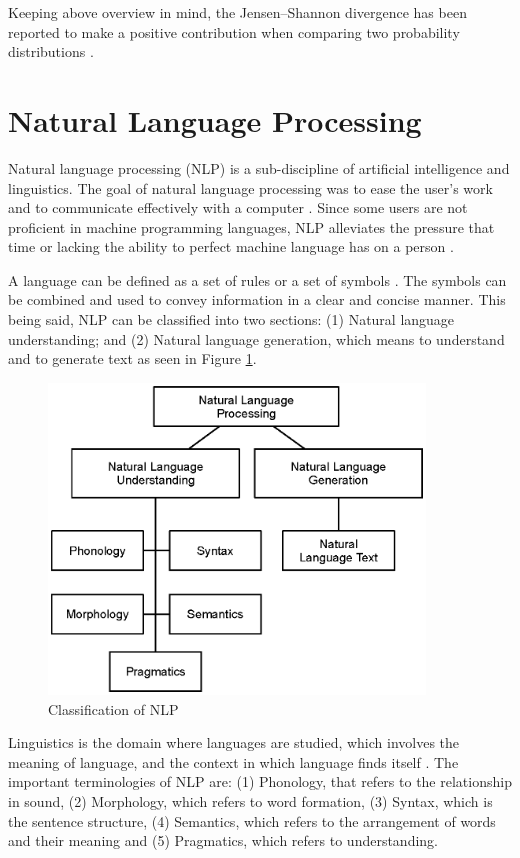 Keeping above overview in mind, the Jensen–Shannon divergence has been reported to make a positive contribution when comparing two probability distributions \cite{Uto2017,9358561}.

\section{Natural Language Processing} \label{secc:LDAover}

Natural language processing (NLP) is a sub-discipline of artificial intelligence and linguistics. The goal of natural language processing was to ease the user’s work and to communicate effectively with a computer \cite{khurana2017natural}. Since some users are not proficient in machine programming languages, NLP alleviates the pressure that time or lacking the ability to perfect machine language has on a person \cite{russell2016artificial}.

A language can be defined as a set of rules or a set of symbols \cite{santana2016language}. The symbols can be combined and used to convey information in a clear and concise manner. This being said, NLP can be classified into two sections: (1) Natural language understanding; and (2) Natural language
generation, which means to understand and to generate text as seen in Figure
\ref{fig:CNLP}.

\begin{figure}[htbp]
\centering
\includegraphics[width=10cm]{./figures/NLP3.eps}
\caption{Classification of NLP}
\label{fig:CNLP}
\end{figure}

Linguistics is the domain where languages are studied, which involves
the meaning of language, and the context in which language finds itself \cite{Bates9977}. The important terminologies of NLP are: (1) Phonology, that refers to the relationship in sound, (2) Morphology, which refers to word formation, (3) Syntax, which is the sentence structure, (4) Semantics, which refers to the arrangement of words and their meaning \cite{hassan2021natural} and (5) Pragmatics, which refers to understanding.


